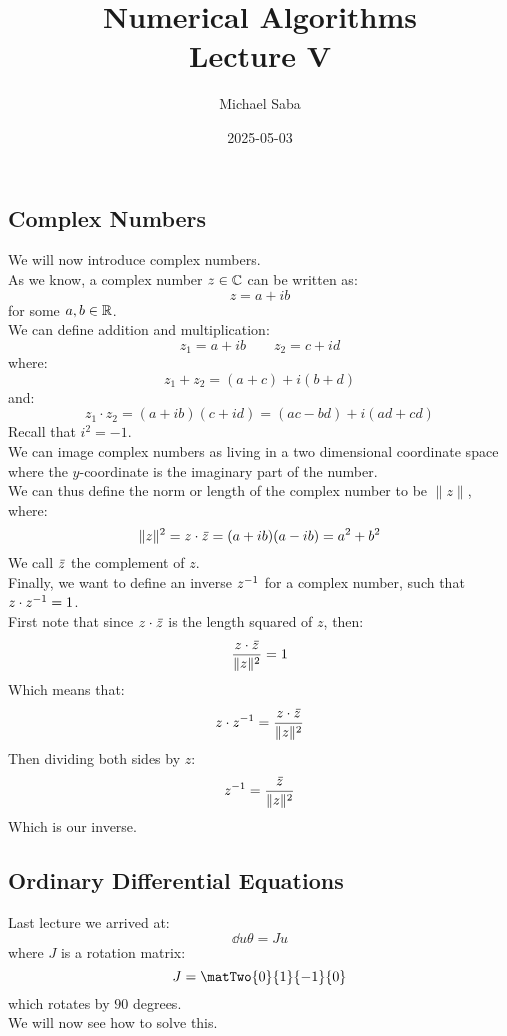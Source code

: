 \documentclass[12pt]{article}
\title{%
    \Huge Numerical Algorithms \\
    \Large Lecture V
}
\date{2025-05-03}
\author{Michael Saba}
\begin{document}
\maketitle
\newpage
\setlength{\parindent}{0pt}

\subsection*{Complex Numbers}

We will now introduce complex numbers. \\
As we know, a complex number $z \in \mathbb{C}$
can be written as:
\[ z = a + ib \]
for some $a, b \in \mathbb{R}$. \\
We can define addition and multiplication:
\[ z_1 = a + ib \qquad z_2 = c + id \]
where:
\[ z_1 + z_2 = (a + c) + i(b + d) \]
and:
\[ z_1 \cdot z_2 = 
(a + ib)(c + id) = 
(ac - bd) + i(ad + cd) \]
Recall that $i^2 = -1$. \\

We can image complex numbers as living
in a two dimensional coordinate space
where the $y$-coordinate is the imaginary
part of the number. \\
We can thus define the norm or length
of the complex number to 
be $\|z\|$, where:
\[ \|z\|^2 = z \cdot \,\overline{\!{z}}
= (a + ib)(a - ib) = a^2 + b^2 \]
We call $\,\overline{\!{z}}$ the complement of $z$. \\

Finally, we want to define an inverse
$z^{-1}$ for a complex number, such that
$z \cdot z^{-1} = 1$. \\
First note that since $z \cdot \,\overline{\!{z}}$
is the length squared of $z$, then:
\[ \dfrac{z \cdot \,\overline{\!{z}}}{\|z\|^2} = 1 \]
Which means that:
\[ z \cdot z^{-1} = 
\dfrac{z \cdot \,\overline{\!{z}}}{\|z\|^2} \]
Then dividing both sides by $z$:
\[ z^{-1} = 
\dfrac{\,\overline{\!{z}}}{\|z\|^2} \]
Which is our inverse. \\

\newpage

\subsection*{Ordinary Differential Equations}

Last lecture we arrived at:
\[ \dd{u}{\theta} = Ju \]
where $J$ is a rotation matrix:
\[ J = \matTwo{0}{1}{-1}{0} \]
which rotates by $90$ degrees. \\
We will now see how to solve this. \\
\end{document}
